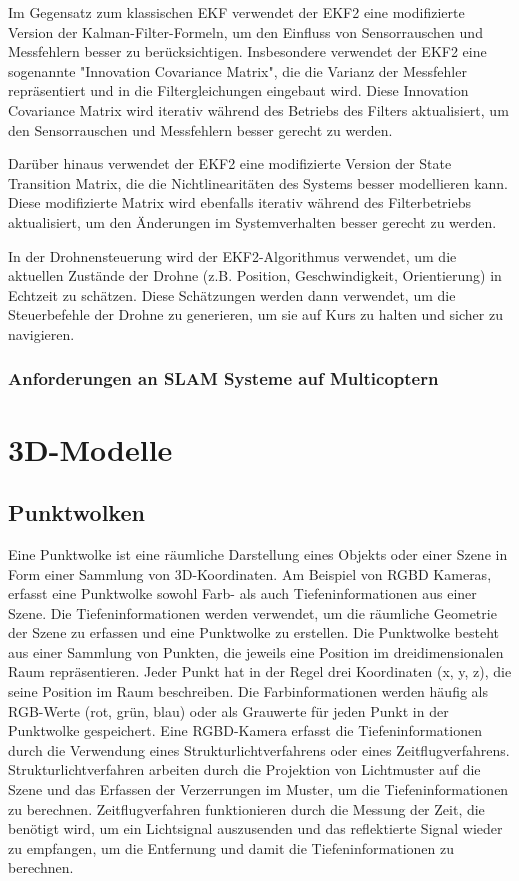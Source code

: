 Im Gegensatz zum klassischen EKF verwendet der EKF2 eine modifizierte Version der Kalman-Filter-Formeln, um den Einfluss von Sensorrauschen und Messfehlern besser zu berücksichtigen. Insbesondere verwendet der EKF2 eine sogenannte "Innovation Covariance Matrix", die die Varianz der Messfehler repräsentiert und in die Filtergleichungen eingebaut wird. Diese Innovation Covariance Matrix wird iterativ während des Betriebs des Filters aktualisiert, um den Sensorrauschen und Messfehlern besser gerecht zu werden.

Darüber hinaus verwendet der EKF2 eine modifizierte Version der State Transition Matrix, die die Nichtlinearitäten des Systems besser modellieren kann. Diese modifizierte Matrix wird ebenfalls iterativ während des Filterbetriebs aktualisiert, um den Änderungen im Systemverhalten besser gerecht zu werden.

In der Drohnensteuerung wird der EKF2-Algorithmus verwendet, um die aktuellen Zustände der Drohne (z.B. Position, Geschwindigkeit, Orientierung) in Echtzeit zu schätzen. Diese Schätzungen werden dann verwendet, um die Steuerbefehle der Drohne zu generieren, um sie auf Kurs zu halten und sicher zu navigieren.

\subsubsection{Anforderungen an \ac{SLAM} Systeme auf Multicoptern}

\section{3D-Modelle} \label{3d-modelle:section}

\subsection{Punktwolken}
Eine Punktwolke ist eine räumliche Darstellung eines Objekts oder einer Szene in Form einer Sammlung von 3D-Koordinaten. Am Beispiel von \ac{RGBD} Kameras, erfasst eine Punktwolke sowohl Farb- als auch Tiefeninformationen aus einer Szene.
Die Tiefeninformationen werden verwendet, um die räumliche Geometrie der Szene zu erfassen und eine Punktwolke zu erstellen.
Die Punktwolke besteht aus einer Sammlung von Punkten, die jeweils eine Position im dreidimensionalen Raum repräsentieren. Jeder Punkt hat in der Regel drei Koordinaten (x, y, z), die seine Position im Raum beschreiben. Die Farbinformationen werden häufig als RGB-Werte (rot, grün, blau) oder als Grauwerte für jeden Punkt in der Punktwolke gespeichert.
Eine RGBD-Kamera erfasst die Tiefeninformationen durch die Verwendung eines Strukturlichtverfahrens oder eines Zeitflugverfahrens. Strukturlichtverfahren arbeiten durch die Projektion von Lichtmuster auf die Szene und das Erfassen der Verzerrungen im Muster, um die Tiefeninformationen zu berechnen. Zeitflugverfahren funktionieren durch die Messung der Zeit, die benötigt wird, um ein Lichtsignal auszusenden und das reflektierte Signal wieder zu empfangen, um die Entfernung und damit die Tiefeninformationen zu berechnen.

